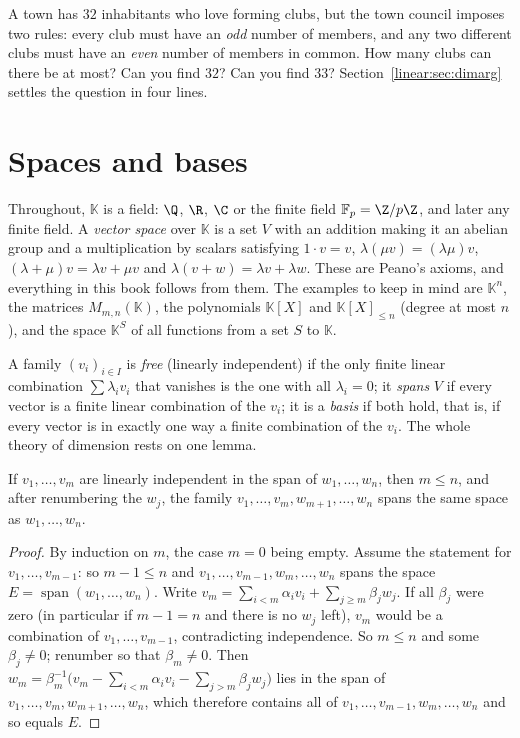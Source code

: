 \begin{think}
A town has $32$ inhabitants who love forming clubs, but the town council imposes two rules: every club must have an
\emph{odd} number of members, and any two different clubs must have an \emph{even} number of members in common. How many
clubs can there be at most? Can you find $32$? Can you find $33$? Section~\ref{linear:sec:dimarg} settles the question in
four lines.
\end{think}

\section{Spaces and bases}

Throughout, $\mathbb K$ is a field: $\Q$, $\R$, $\C$ or the finite field $\mathbb F_p=\Z/p\Z$, and later any finite field.
A \emph{vector space} over $\mathbb K$ is a set $V$ with an addition making it an abelian group and a multiplication by
scalars satisfying $1\cdot v=v$, $\lambda(\mu v)=(\lambda\mu)v$, $(\lambda+\mu)v=\lambda v+\mu v$ and
$\lambda(v+w)=\lambda v+\lambda w$. These are Peano's axioms, and everything in this book follows from them. The
examples to keep in mind are $\mathbb K^n$, the matrices $M_{m,n}(\mathbb K)$, the polynomials $\mathbb K[X]$ and
$\mathbb K[X]_{\le n}$ (degree at most $n$), and the space $\mathbb K^S$ of all functions from a set $S$ to $\mathbb K$.

A family $(v_i)_{i\in I}$ is \emph{free} (linearly independent) if the only finite linear combination
$\sum\lambda_iv_i$ that vanishes is the one with all $\lambda_i=0$; it \emph{spans} $V$ if every vector is a finite
linear combination of the $v_i$; it is a \emph{basis} if both hold, that is, if every vector is in exactly one way a
finite combination of the $v_i$. The whole theory of dimension rests on one lemma.

\begin{lemma}\label{linear:lem:steinitz}
If $v_1,\dots,v_m$ are linearly independent in the span of $w_1,\dots,w_n$, then $m\le n$, and after renumbering the
$w_j$, the family $v_1,\dots,v_m,w_{m+1},\dots,w_n$ spans the same space as $w_1,\dots,w_n$.
\end{lemma}
\begin{proof}
By induction on $m$, the case $m=0$ being empty. Assume the statement for $v_1,\dots,v_{m-1}$: so $m-1\le n$ and
$v_1,\dots,v_{m-1},w_m,\dots,w_n$ spans the space $E=\operatorname{span}(w_1,\dots,w_n)$. Write
$v_m=\sum_{i<m}\alpha_iv_i+\sum_{j\ge m}\beta_jw_j$. If all $\beta_j$ were zero (in particular if $m-1=n$ and there is no
$w_j$ left), $v_m$ would be a combination of $v_1,\dots,v_{m-1}$, contradicting independence. So $m\le n$ and some
$\beta_j\ne0$; renumber so that $\beta_m\ne0$. Then $w_m=\beta_m^{-1}\bigl(v_m-\sum_{i<m}\alpha_iv_i-\sum_{j>m}\beta_jw_j\bigr)$
lies in the span of $v_1,\dots,v_m,w_{m+1},\dots,w_n$, which therefore contains all of $v_1,\dots,v_{m-1},w_m,\dots,w_n$
and so equals $E$.
\end{proof}

